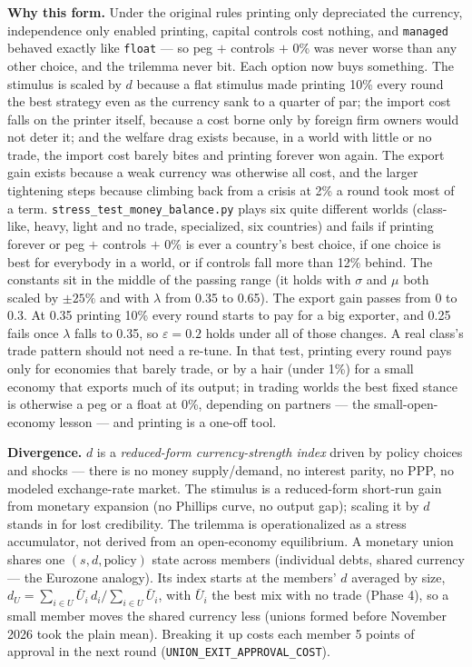 \documentclass[11pt]{article}
\newcommand{\code}[1]{\texttt{#1}}
\begin{document}
\textbf{Why this form.} Under the original rules printing only depreciated the
currency, independence only enabled printing, capital controls cost nothing, and
\code{managed} behaved exactly like \code{float} --- so peg $+$ controls $+$ 0\%
was never worse than any other choice, and the trilemma never bit. Each option now
buys something. The stimulus is scaled by $d$ because a flat stimulus made printing
10\% every round the best strategy even as the currency sank to a quarter of par;
the import cost falls on the printer itself, because a cost borne only by foreign
firm owners would not deter it; and the welfare drag exists because, in a world
with little or no trade, the import cost barely bites and printing forever won
again. The export gain exists because a weak currency was otherwise all cost, and
the larger tightening steps because climbing back from a crisis at 2\% a round took
most of a term. \code{stress\_test\_money\_balance.py} plays six quite different
worlds (class-like, heavy, light and no trade, specialized, six countries) and
fails if printing forever or peg $+$ controls $+$ 0\% is ever a country's best
choice, if one choice is best for everybody in a world, or if controls fall more
than 12\% behind. The constants sit in the middle of the passing range (it holds
with $\sigma$ and $\mu$ both scaled by $\pm 25\%$ and with $\lambda$ from 0.35 to
0.65). The export gain passes from 0 to 0.3. At 0.35 printing 10\% every round
starts to pay for a big exporter, and 0.25 fails once $\lambda$ falls to 0.35, so
$\varepsilon = 0.2$ holds under all of those changes. A real class's trade pattern
should not need a re-tune. In that test, printing every round pays only for
economies that barely trade, or by a hair (under 1\%) for a small economy that
exports much of its output; in trading worlds the best fixed stance is otherwise a
peg or a float at 0\%, depending on partners --- the small-open-economy lesson ---
and printing is a one-off tool.

\textbf{Divergence.} $d$ is a \emph{reduced-form currency-strength index} driven by
policy choices and shocks --- there is no money supply/demand, no interest parity,
no PPP, no modeled exchange-rate market. The stimulus is a reduced-form short-run
gain from monetary expansion (no Phillips curve, no output gap); scaling it by $d$
stands in for lost credibility. The trilemma is operationalized as a stress
accumulator, not derived from an open-economy equilibrium. A monetary union shares
one $(s,d,\text{policy})$ state across members (individual debts, shared currency
--- the Eurozone analogy). Its index starts at the members' $d$ averaged by size,
$d_U = \sum_{i \in U} \bar U_i\, d_i \big/ \sum_{i \in U} \bar U_i$, with $\bar U_i$
the best mix with no trade (Phase 4), so a small member moves the shared currency
less (unions formed before November 2026 took the plain mean). Breaking it up
costs each member 5 points of approval in the next round
(\code{UNION\_EXIT\_APPROVAL\_COST}).
\end{document}
